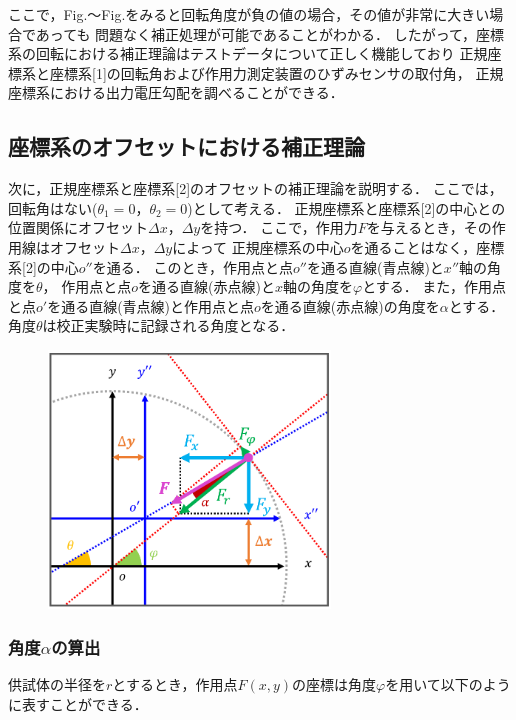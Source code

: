 ここで，Fig.～Fig.をみると回転角度が負の値の場合，その値が非常に大きい場合であっても
問題なく補正処理が可能であることがわかる．
したがって，座標系の回転における補正理論はテストデータについて正しく機能しており
正規座標系と座標系[1]の回転角および作用力測定装置のひずみセンサの取付角，
正規座標系における出力電圧勾配を調べることができる．

\subsection{座標系のオフセットにおける補正理論}

次に，正規座標系と座標系[2]のオフセットの補正理論を説明する．
ここでは，回転角はない($\theta_1 = 0$，$\theta_2 = 0$)として考える．
正規座標系と座標系[2]の中心との位置関係にオフセット$\Delta x$，$\Delta y$を持つ．
ここで，作用力$F$を与えるとき，その作用線はオフセット$\Delta x$，$\Delta y$によって
正規座標系の中心$o$を通ることはなく，座標系[2]の中心$o''$を通る．
このとき，作用点と点$o''$を通る直線(青点線)と$x''$軸の角度を$\theta$，
作用点と点$o$を通る直線(赤点線)と$x$軸の角度を$\varphi$とする．
また，作用点と点$o'$を通る直線(青点線)と作用点と点$o$を通る直線(赤点線)の角度を$\alpha$とする．
角度$\theta$は校正実験時に記録される角度となる．

\begin{figure}[htbp]
    \footnotesize
    \begin{center}
        \includegraphics[width=75mm]{images/34-1.png}
        \caption{}
    \end{center}
\end{figure}

\subsubsection{角度$\alpha$の算出}
供試体の半径を$r$とするとき，作用点$F(x,y)$の座標は角度$\varphi$を用いて以下のように表すことができる．

